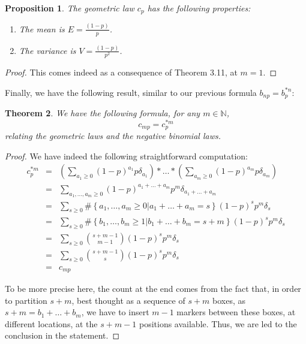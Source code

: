 \documentclass[12pt]{amsbook}
\newtheorem{theorem}{Theorem}[chapter]
\newtheorem{proposition}[theorem]{Proposition}
\begin{document}
\begin{proposition}
The geometric law $c_p$ has the following properties:
\begin{enumerate}
\item The mean is $E=\frac{(1-p)}{p}$.

\item The variance is $V=\frac{(1-p)}{p^2}$.
\end{enumerate}
\end{proposition}

\begin{proof}
This comes indeed as a consequence of Theorem 3.11, at $m=1$.
\end{proof}

Finally, we have the following result, similar to our previous formula $b_{np}=b_p^{*n}$:

\begin{theorem}
We have the following formula, for any $m\in\mathbb N$,
$$c_{mp}=c_p^{*m}$$
relating the geometric laws and the negative binomial laws.
\end{theorem}

\begin{proof}
We have indeed the following straightforward computation:
\begin{eqnarray*}
c_p^{*m}
&=&\left(\sum_{a_1\geq0}(1-p)^{a_1}p\delta_{a_1}\right)*\ldots*\left(\sum_{a_m\geq0}(1-p)^{a_m}p\delta_{a_m}\right)\\
&=&\sum_{a_1,\ldots,a_m\geq0}(1-p)^{a_1+\ldots+a_m}p^m\delta_{a_1+\ldots+a_m}\\
&=&\sum_{s\geq0}\#\left\{a_1,\ldots,a_m\geq0\Big|a_1+\ldots+a_m=s\right\}(1-p)^sp^m\delta_s\\
&=&\sum_{s\geq0}\#\left\{b_1,\ldots,b_m\geq1\Big|b_1+\ldots+b_m=s+m\right\}(1-p)^sp^m\delta_s\\
&=&\sum_{s\geq0}\binom{s+m-1}{m-1}(1-p)^sp^m\delta_s\\
&=&\sum_{s\geq0}\binom{s+m-1}{s}(1-p)^sp^m\delta_s\\
&=&c_{mp}
\end{eqnarray*}

To be more precise here, the count at the end comes from the fact that, in order to partition $s+m$, best thought as a sequence of $s+m$ boxes, as $s+m=b_1+\ldots+b_m$, we have to insert $m-1$ markers between these boxes, at different locations, at the $s+m-1$ positions available. Thus, we are led to the conclusion in the statement.
\end{proof}
\end{document}
